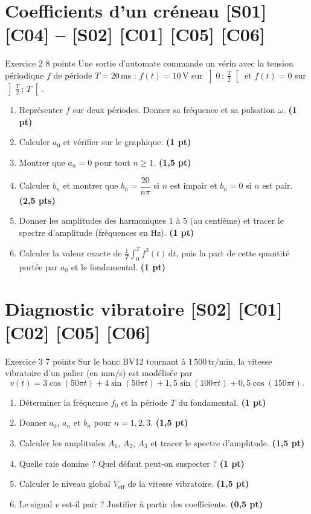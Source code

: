 \documentclass[a4paper,11pt]{article}
\newcommand{\pts}[1]{\hfill{\color{uimmred}\small\textbf{(#1)}}}
\begin{document}
\needspace{8cm}
\section{Coefficients d'un créneau \hfill {\normalsize\color{uimmred}[S01] [C04] -- [S02] [C01] [C05] [C06]}}
\begin{exo}{Exercice 2 \hfill 8 points}
\label{ev:2}
Une sortie d'automate commande un vérin avec la tension périodique $f$ de période $T = 20$\,ms : $f(t) = 10$\,V sur $\left]0\,;\,\frac T2\right[$ et $f(t) = 0$ sur $\left]\frac T2\,;\,T\right[$.
\begin{enumerate}
  \item Représenter $f$ sur deux périodes. Donner sa fréquence et sa pulsation $\omega$. \pts{1 pt}
  \item Calculer $a_0$ et vérifier sur le graphique. \pts{1 pt}
  \item Montrer que $a_n = 0$ pour tout $n\geq 1$. \pts{1,5 pt}
  \item Calculer $b_n$ et montrer que $b_n = \dfrac{20}{n\pi}$ si $n$ est impair et $b_n = 0$ si $n$ est pair. \pts{2,5 pts}
  \item Donner les amplitudes des harmoniques $1$ à $5$ (au centième) et tracer le spectre d'amplitude (fréquences en Hz). \pts{1 pt}
  \item Calculer la valeur exacte de $\frac1T\int_0^T f^2(t)\,\mathrm dt$, puis la part de cette quantité portée par $a_0$ et le fondamental. \pts{1 pt}
\end{enumerate}
\end{exo}

\needspace{8cm}
\section{Diagnostic vibratoire \hfill {\normalsize\color{uimmred}[S02] [C01] [C02] [C05] [C06]}}
\begin{exo}{Exercice 3 \hfill 7 points}
\label{ev:3}
Sur le banc BV12 tournant à $1\,500$\,tr/min, la vitesse vibratoire d'un palier (en mm/s) est modélisée par
\[
v(t) = 3\cos(50\pi t) + 4\sin(50\pi t) + 1{,}5\sin(100\pi t) + 0{,}5\cos(150\pi t).
\]
\begin{enumerate}
  \item Déterminer la fréquence $f_0$ et la période $T$ du fondamental. \pts{1 pt}
  \item Donner $a_0$, $a_n$ et $b_n$ pour $n = 1, 2, 3$. \pts{1,5 pt}
  \item Calculer les amplitudes $A_1$, $A_2$, $A_3$ et tracer le spectre d'amplitude. \pts{1,5 pt}
  \item Quelle raie domine ? Quel défaut peut-on suspecter ? \pts{1 pt}
  \item Calculer le niveau global $V_{\text{eff}}$ de la vitesse vibratoire. \pts{1,5 pt}
  \item Le signal $v$ est-il pair ? Justifier à partir des coefficients. \pts{0,5 pt}
\end{enumerate}
\end{exo}
\end{document}
